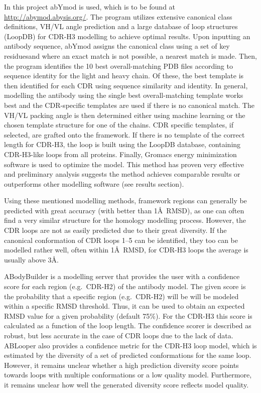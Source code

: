 \documentclass[12pt]{article}
\begin{document}
In this project abYmod is used, which is to be found at
\url{http://abymod.abysis.org/}. The program utilizes extensive canonical
class definitions, VH/VL angle prediction and a large database of loop
structures (LoopDB) for CDR-H3 modelling to achieve optimal
results. Upon inputting an antibody sequence, abYmod assigns the
canonical class using a set of key residues\cite{Martin1996}and where
an exact match is not possible, a nearest match is made. Then, the
program identifies the 10 best overall-matching PDB files according to
sequence identity for the light and heavy chain. Of these, the best
template is then identified for each CDR using sequence similarity and
identity. In general, modelling the antibody using the single best
overall-matching template works best and the CDR-specific templates
are used if there is no canonical match. The VH/VL packing angle is
then determined either using machine learning or the chosen template
structure for one of the chains. CDR specific templates, if selected,
are grafted onto the framework. If there is no template of the correct
length for CDR-H3, the loop is built using the LoopDB database,
containing CDR-H3-like loops from all proteins. Finally, Gromacs energy
minimization software is used to optimize the model. This method has
proven very effective and preliminary analysis suggests the method
achieves comparable results or outperforms other modelling software
(see results section).

Using these mentioned modelling methods, framework regions can
generally be predicted with great accuracy (with better than 1\AA\
RMSD\cite{Almagro2014}), as one can often find a very similar
structure for the homology modelling process.  However, the CDR loops
are not as easily predicted due to their great diversity. If the
canonical conformation of CDR loops 1--5 can be identified, they too
can be modelled rather well, often within 1\AA\ RMSD, for CDR-H3 loops
the average is usually above 3\AA\cite{Almagro2011}.

ABodyBuilder is a modelling server that provides the user with a
confidence score for each region (e.g.\ CDR-H2) of the antibody
model. The given score is the probability that a specific region
(e.g.\ CDR-H2) will be will be modeled within a specific RMSD
threshold\cite{Leem2016}. Thus, it can be used to obtain an expected
RMSD value for a given probability (default 75\%). For the CDR-H3 this
score is calculated as a function of the loop length.  The confidence
scorer is described as robust, but less accurate in the case of CDR
loops due to the lack of data\cite{Leem2016}. ABLooper also provides a
confidence metric for the CDR-H3 loop model, which is estimated by the
diversity of a set of predicted conformations for the same
loop\cite{Abanades2022}. However, it remains unclear whether a high
prediction diversity score points towards loops with multiple
conformations or a low quality model. Furthermore, it remains unclear
how well the generated diversity score reflects model
quality\cite{Abanades2022}.
\end{document}
